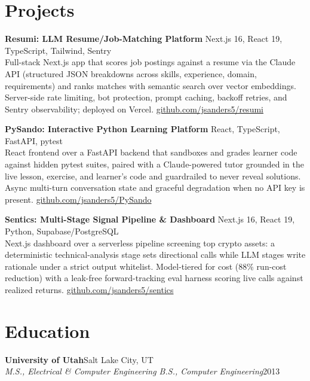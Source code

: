\documentclass[10.5pt, letterpaper]{article}
\newcommand{\jobentry}[4]{%
  \noindent
  \textbf{\color{accent}#1}\hfill\textcolor{muted}{\small #2}\\
  \textit{#3}\hfill\textcolor{muted}{\small #4}%
}
\begin{document}
\section{Projects}

\noindent\textbf{Resumi: LLM Resume/Job-Matching Platform}
\hfill\textcolor{muted}{\small Next.js 16, React 19, TypeScript, Tailwind, Sentry}\\
Full-stack Next.js app that scores job postings against a resume via the Claude
API (structured JSON breakdowns across skills, experience, domain, requirements)
and ranks matches with semantic search over vector embeddings. Server-side rate
limiting, bot protection, prompt caching, backoff retries, and Sentry
observability; deployed on Vercel.
\hfill\textcolor{muted}{\small\href{https://github.com/jsanders5/resumi}{github.com/jsanders5/resumi}}

\vspace{5pt}

\noindent\textbf{PySando: Interactive Python Learning Platform}
\hfill\textcolor{muted}{\small React, TypeScript, FastAPI, pytest}\\
React frontend over a FastAPI backend that sandboxes and grades learner code
against hidden pytest suites, paired with a Claude-powered tutor grounded in the
live lesson, exercise, and learner's code and guardrailed to never reveal
solutions. Async multi-turn conversation state and graceful degradation when no
API key is present.
\hfill\textcolor{muted}{\small\href{https://github.com/jsanders5/PySando}{github.com/jsanders5/PySando}}

\vspace{5pt}

\noindent\textbf{Sentics: Multi-Stage Signal Pipeline \& Dashboard}
\hfill\textcolor{muted}{\small Next.js 16, React 19, Python, Supabase/PostgreSQL}\\
Next.js dashboard over a serverless pipeline screening top crypto assets: a
deterministic technical-analysis stage sets directional calls while LLM stages
write rationale under a strict output whitelist. Model-tiered for cost (88\%
run-cost reduction) with a leak-free forward-tracking eval harness scoring live
calls against realized returns.
\hfill\textcolor{muted}{\small\href{https://github.com/jsanders5/sentics}{github.com/jsanders5/sentics}}

\section{Education}

\jobentry{University of Utah}{Salt Lake City, UT}%
  {M.S., Electrical \& Computer Engineering \enspace\textbullet\enspace
   B.S., Computer Engineering}{2013}
\end{document}
